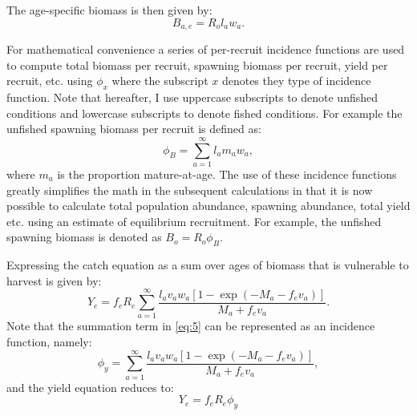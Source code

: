 \documentclass[12pt]{article}
\begin{document}
The age-specific biomass is then given by:
\begin{equation}\label{eq:3}
	B_{a,e} = R_o l_a w_a.
\end{equation}

For mathematical convenience a series of per-recruit incidence functions are used to compute total biomass per recruit, spawning biomass per recruit, yield per recruit, etc. using $\phi_{x}$ where the subscript $x$ denotes they type of incidence function.  Note that hereafter, I use uppercase subscripts to denote unfished conditions and lowercase subscripts to denote fished conditions.   For example the unfished spawning biomass per recruit is defined as:
\begin{equation}\label{eq:4}
	\phi_{B} = \sum_{a=1}^\infty l_a m_a w_a,
\end{equation}
where $m_a$ is the proportion mature-at-age. The use of these incidence functions greatly simplifies the math in the subsequent calculations in that it is now possible to calculate total population abundance, spawning abundance, total yield etc. using an estimate of equilibrium recruitment.  For example, the unfished spawning biomass is denoted as $B_o = R_o \phi_B$.

Expressing the catch equation as a sum over ages of biomass that is vulnerable to harvest is given by:
\begin{equation}\label{eq:5}
	Y_e = f_e R_e \sum_{a=1}^\infty \frac{l_a v_a w_a [1-\exp(-M_a-f_e v_a)]}
	{M_a+f_e v_a}.
\end{equation}
Note that the summation term in \eqref{eq:5} can be represented as an incidence function, namely:
\begin{equation}\label{eq:6}
	\phi_y = \sum_{a=1}^\infty \frac{l_a v_a w_a [1-\exp(-M_a-f_e v_a)]}
	{M_a+f_e v_a},
\end{equation}
and the yield equation reduces to:
\begin{equation}\label{eq:7}
	Y_e = f_e R_e \phi_y
\end{equation}
\end{document}
